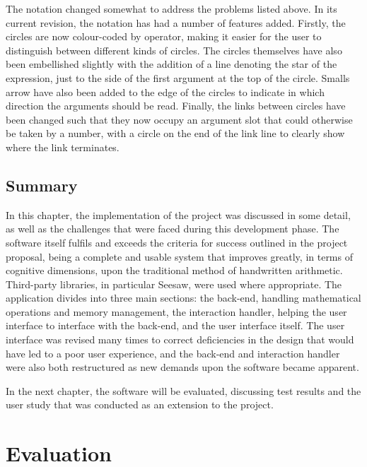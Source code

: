 \documentclass[12pt,twoside,notitlepage,xetex]{report}
\begin{document}

The notation changed somewhat to address the problems listed above.  In its
current revision, the notation has had a number of features added.  Firstly,
the circles are now colour-coded by operator, making it easier for the user to
distinguish between different kinds of circles.  The circles themselves have
also been embellished slightly with the addition of a line denoting the star of
the expression, just to the side of the first argument at the top of the
circle.  Smalls arrow have also been added to the edge of the circles to
indicate in which direction the arguments should be read.  Finally, the links
between circles have been changed such that they now occupy an argument slot
that could otherwise be taken by a number, with a circle on the end of the link
line to clearly show where the link terminates.


\section{Summary}

In this chapter, the implementation of the project was discussed in some
detail, as well as the challenges that were faced during this development
phase.  The software itself fulfils and exceeds the criteria for success
outlined in the project proposal, being a complete and usable system that
improves greatly, in terms of cognitive dimensions, upon the traditional method
of handwritten arithmetic.  Third-party libraries, in particular Seesaw, were
used where appropriate.  The application divides into three main sections: the
back-end, handling mathematical operations and memory management, the
interaction handler, helping the user interface to interface with the back-end,
and the user interface itself.  The user interface was revised many times to
correct deficiencies in the design that would have led to a poor user
experience, and the back-end and interaction handler were also both restructured
as new demands upon the software became apparent.

In the next chapter, the software will be evaluated, discussing test results
and the user study that was conducted as an extension to the project.

\cleardoublepage
\chapter{Evaluation}
\end{document}
